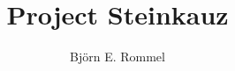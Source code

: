 \documentclass{article}
\begin{document}
\title{Project Steinkauz}
\author{Bj\"orn E. Rommel}
\date{}

\maketitle
\end{document}
